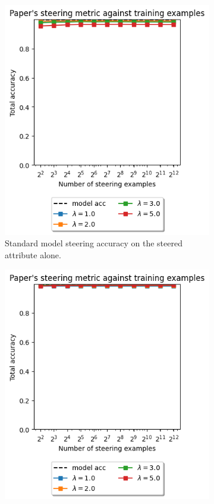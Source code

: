 \begin{figure}
    \centering
    \begin{subfigure}{0.45\textwidth}
        \includegraphics[width=\textwidth]{figures/no-residual-full-reproduction.png}
        \caption{Standard model steering accuracy on the steered attribute alone.}
        \label{fig:nr-correct}
    \end{subfigure}
    \hfill
    \begin{subfigure}{0.45\textwidth}
        \includegraphics[width=\textwidth]{figures/residual-full-reproduction.png}

\end{subfigure}
\end{figure}
